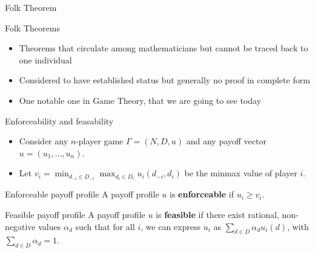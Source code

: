 \begin{frame}{Folk Theorem}
    \begin{block}{Folk Theorems}
        \begin{itemize}
            \item Theorems that circulate among mathematicians but cannot be traced back to one individual
            \item Considered to have established status but generally no proof in complete form
            \item One notable one in Game Theory, that we are going to see today
        \end{itemize}
    \end{block}
\end{frame}

\begin{frame}{Enforceability and feasability}
    \begin{itemize}
        \item Consider any $n$-player game $\Gamma = (N, D, u)$ and any payoff vector
        $u = (u_1, \dots, u_n)$.
        \item Let $v_i= \min_{d_{-i}\in D_{-i}} \max_{d_i\in D_i} u_i(d_{-i}, d_i)$ be
        the minmax value of player $i$.
    \end{itemize}

    \begin{block}{Enforceable payoff profile}
        A payoff profile $u$ is \textbf{enforceable} if $u_i \geq v_i$.
    \end{block}

    \begin{block}{Feasible payoff profile}
        A payoff profile $u$ is \textbf{feasible} if there exist rational, non-negative
        values $\alpha_d$ such that for all $i$, we can express $u_i$ as
        $\sum_{d\in D} \alpha_d u_i(d)$, with $\sum_{d\in D} \alpha_d = 1$.
    \end{block}
\end{frame}

